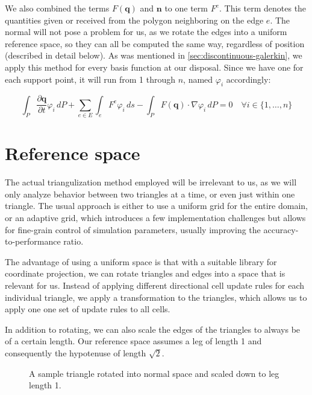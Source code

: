 \documentclass[a4paper, twoside]{article}
\newcommand{\pd}[2]{\dfrac{\partial #1}{\partial #2}}
\renewcommand{\phi}{\varphi}
\begin{document}
We also combined the terms $F(\mathbf{q})$ and $\mathbf{n}$ to one term $F^e$. This term denotes the quantities given or received from the polygon neighboring on the edge $e$. The normal will not pose a problem for us, as we rotate the edges into a uniform reference space, so they can all be computed the same way, regardless of position (described in detail below). As was mentioned in \ref{sec:discontinuous-galerkin}, we apply this method for every basis function at our disposal. Since we have one for each support point, it will run from 1 through $n$, named $\phi_i$ accordingly:

\begin{equation}
  \label{eq:shallow-water-weak-form-div-applied-approximation}
  \int_P \pd {\mathbf{q}}{t} \phi_i \, dP +
  \sum_{e \in E} \int_{e} F^e \phi_i \, ds  -
  \int_P F(\mathbf{q}) \cdot \nabla \phi_i \, dP = 0
  \quad \forall i \in \{1, \dots, n\}
\end{equation}

\section{Reference space}
\label{sec:reference-space}

The actual triangulization method employed will be irrelevant to us, as we will only analyze behavior between two triangles at a time, or even just within one triangle.
The usual approach is either to use a uniform grid for the entire domain, or an adaptive grid, which introduces a few implementation challenges but allows for fine-grain control of simulation parameters, usually improving the accuracy-to-performance ratio.

The advantage of using a uniform space is that with a suitable library for coordinate projection, we can rotate triangles and edges into a space that is relevant for us.
Instead of applying different directional cell update rules for each individual triangle, we apply a transformation to the triangles, which allows us to apply one one set of update rules to all cells.

In addition to rotating, we can also scale the edges of the triangles to always be of a certain length.
Our reference space assumes a leg of length 1 and consequently the hypotenuse of length $\sqrt{2}$.

\begin{figure}[ht]
  \centering
  \caption{A sample triangle rotated into normal space and scaled down to leg length 1.}
  \label{fig:triangle-projection}
\end{figure}
\end{document}
